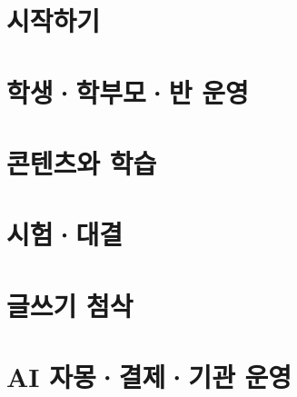 \documentclass[11pt,oneside]{book}
\begin{document}
\kfTitlePage

\frontmatter
\tableofcontents

\mainmatter

\part*{시작하기}


\part{학생·학부모·반 운영}






\part{콘텐츠와 학습}




\part{시험·대결}



\part{글쓰기 첨삭}


\part{AI 자몽·결제·기관 운영}



\end{document}
